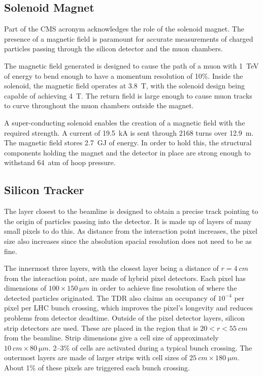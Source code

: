 \subsection{Solenoid Magnet}

Part of the CMS acronym acknowledges the role of the solenoid
magnet. 
The presence of a magnetic field is paramount for accurate measurements
of charged particles passing through the silicon detector and the muon chambers.

The magnetic field generated is designed to cause the path of
a muon with \SI{1}{TeV} of energy to bend enough to have a momentum resolution of 10\%.
Inside the solenoid, the magnetic field operates at \SI{3.8}{T},
with the solenoid design being capable of achieving \SI{4}{T}.
The return field is large enough to cause muon tracks to curve throughout
the muon chambers outside the magnet.

A super-conducting solenoid enables the creation of a magnetic field
with the required strength.
A current of \SI{19.5}{kA} is sent through 2168 turns over \SI{12.9}{m}.
The magnetic field stores \SI{2.7}{GJ} of energy.
In order to hold this, the structural components holding the magnet and
the detector in place are strong enough to withstand \SI{64}{atm} of hoop pressure.

\subsection{Silicon Tracker}

The layer closest to the beamline is designed to obtain a precise track pointing
to the origin of particles passing into the detector.
It is made up of layers of many small pixels to do this.
As distance from the interaction point increases, the pixel size also increases
since the absolution spacial resolution does not need to be as fine.

The innermost three layers, with the closest layer being a distance of
$r=\SI{4}{cm}$ from the interaction point,
are made of hybrid pixel detectors.
Each pixel has dimensions of $100 \times \SI{150}{\micro m}$
in order to achieve fine resolution of where the detected particles originated.
The TDR also claims an occupancy of $10^{-4}$ per pixel per LHC bunch crossing,
which improves the pixel's longevity and reduces problems from detector deadtime.
Outside of the pixel detector layers,
silicon strip detectors are used. 
These are placed in the region that is $20 < r < \SI{55}{cm}$ from the beamline.
Strip dimensions give a cell size of approximately $\SI{10}{cm} \times \SI{80}{\micro m}$.
2--3\% of cells are activated during a typical bunch crossing.
The outermost layers are made of larger strips with cell sizes of
$\SI{25}{cm} \times \SI{180}{\micro m}$.
About 1\% of these pixels are triggered each bunch crossing.

